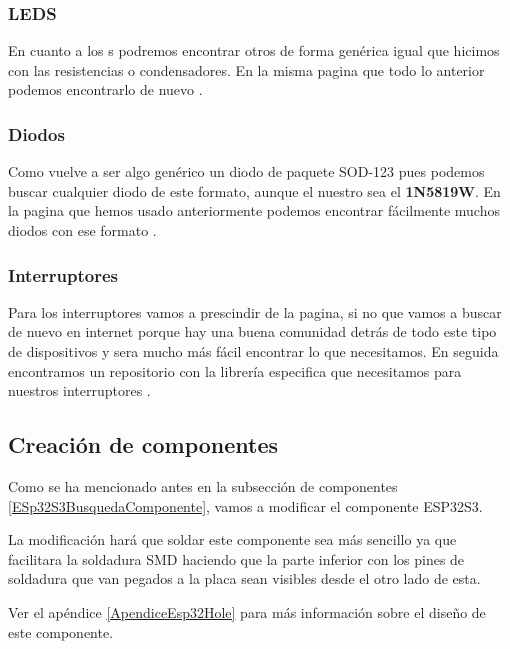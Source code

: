 \subsubsection{\gls{LED}S}

En cuanto a los s podremos encontrar otros de forma genérica igual que hicimos con las resistencias o condensadores. En la misma pagina que todo lo anterior podemos encontrarlo de nuevo \cite{SnapedaWS2812B}.

\subsubsection{Diodos}

Como vuelve a ser algo genérico un diodo de paquete SOD-123 pues podemos buscar cualquier diodo de este formato, aunque el nuestro sea el \textbf{1N5819W}. En la pagina que hemos usado anteriormente podemos encontrar fácilmente muchos diodos con ese formato \cite{Snapeda1N5819W}.

\subsubsection{Interruptores}

Para los interruptores vamos a prescindir de la pagina, si no que vamos a buscar de nuevo en internet porque hay una buena comunidad detrás de todo este tipo de dispositivos y sera mucho más fácil encontrar lo que necesitamos. En seguida encontramos un repositorio con la librería especifica que necesitamos para nuestros interruptores \cite{GitInterruptores}.

\subsection{Creación de componentes}

Como se ha mencionado antes en la subsección de componentes \ref{ESp32S3BusquedaComponente}, vamos a modificar el componente ESP32S3.

La modificación hará que soldar este componente sea más sencillo ya que facilitara la soldadura \gls{SMD} haciendo que la parte inferior con los pines de soldadura que van pegados a la placa sean visibles desde el otro lado de esta.

\begin{tcolorbox}[colback=blue!5!white, colframe=blue!55!white, title=Nota]
    Ver el apéndice \ref{ApendiceEsp32Hole} para más información sobre el diseño de este componente.
\end{tcolorbox}

